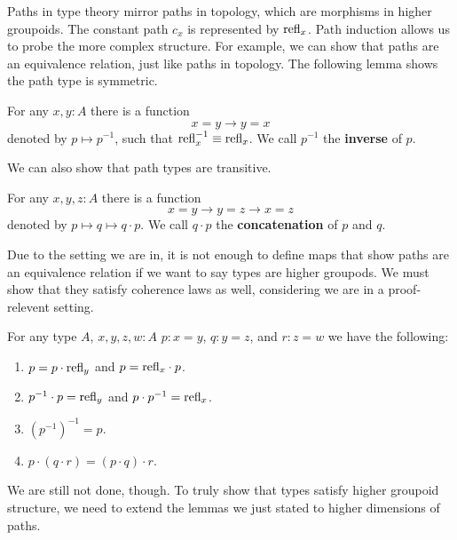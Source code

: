 \documentclass[main.tex]{subfiles}
\begin{document}
Paths in type theory mirror paths in topology, which are morphisms in higher groupoids. The constant path
 $c_x$ is represented by $\text{refl}_{x}$. Path induction allows us to probe the more complex structure. For example, 
 we can show that paths are an equivalence relation, just like paths in topology. The following lemma shows the path type
  is symmetric.
\begin{lemma}
    For any $x,y : A$ there is a function
    $$x = y \to y = x$$
    denoted by $p \mapsto p^{-1}$, such that $\text{refl}_{x}^{-1} \equiv \text{refl}_{x}$. We call $p^{-1}$ the \textbf{inverse} of $p$.
\end{lemma}
We can also show that path types are transitive.
\begin{lemma}
    For any $x,y,z : A$ there is a function
    $$x = y \to y = z \to x = z$$
    denoted by $p \mapsto q \mapsto q \cdot p$. We call $q \cdot p$ the \textbf{concatenation} of $p$ and $q$.
\end{lemma}
Due to the setting we are in, it is not enough to define maps that show paths are an equivalence relation if we want to say
 types are higher groupods. We must show that they satisfy coherence laws as well, considering we are in a proof-relevent setting.
\begin{lemma}
    For any type $A$, $x,y,z,w : A$ $p : x =y$, $q : y = z$, and $r : z = w$ we have the following:
    \begin{enumerate}
        \item $p = p \cdot \text{refl}_{y}$ and $p = \text{refl}_{x} \cdot p$.
        \item $p^{-1} \cdot p = \text{refl}_{y}$ and $p \cdot p^{-1} = \text{refl}_{x}$.
        \item $(p^{-1})^{-1} = p$.
        \item $p \cdot (q \cdot r) = (p \cdot q) \cdot r$.
    \end{enumerate}
\end{lemma}
We are still not done, though. To truly show that types satisfy higher groupoid structure, we need to extend the lemmas we just stated
to higher dimensions of paths.
\end{document}

